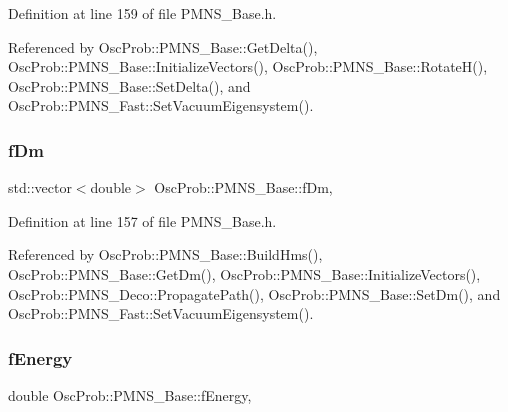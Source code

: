 Definition at line 159 of file P\+M\+N\+S\+\_\+\+Base.\+h.



Referenced by Osc\+Prob\+::\+P\+M\+N\+S\+\_\+\+Base\+::\+Get\+Delta(), Osc\+Prob\+::\+P\+M\+N\+S\+\_\+\+Base\+::\+Initialize\+Vectors(), Osc\+Prob\+::\+P\+M\+N\+S\+\_\+\+Base\+::\+Rotate\+H(), Osc\+Prob\+::\+P\+M\+N\+S\+\_\+\+Base\+::\+Set\+Delta(), and Osc\+Prob\+::\+P\+M\+N\+S\+\_\+\+Fast\+::\+Set\+Vacuum\+Eigensystem().

\mbox{\label{classOscProb_1_1PMNS__Base_a406a31c3b5d620e5a0cace5b411f9f70}} 
\subsubsection{\texorpdfstring{f\+Dm}{fDm}}
{\footnotesize\ttfamily std\+::vector$<$double$>$ Osc\+Prob\+::\+P\+M\+N\+S\+\_\+\+Base\+::f\+Dm\hspace{0.3cm}{\ttfamily [protected]}, {\ttfamily [inherited]}}



Definition at line 157 of file P\+M\+N\+S\+\_\+\+Base.\+h.



Referenced by Osc\+Prob\+::\+P\+M\+N\+S\+\_\+\+Base\+::\+Build\+Hms(), Osc\+Prob\+::\+P\+M\+N\+S\+\_\+\+Base\+::\+Get\+Dm(), Osc\+Prob\+::\+P\+M\+N\+S\+\_\+\+Base\+::\+Initialize\+Vectors(), Osc\+Prob\+::\+P\+M\+N\+S\+\_\+\+Deco\+::\+Propagate\+Path(), Osc\+Prob\+::\+P\+M\+N\+S\+\_\+\+Base\+::\+Set\+Dm(), and Osc\+Prob\+::\+P\+M\+N\+S\+\_\+\+Fast\+::\+Set\+Vacuum\+Eigensystem().

\mbox{\label{classOscProb_1_1PMNS__Base_a2800af6d436972f3e900867790c046b0}} 
\subsubsection{\texorpdfstring{f\+Energy}{fEnergy}}
{\footnotesize\ttfamily double Osc\+Prob\+::\+P\+M\+N\+S\+\_\+\+Base\+::f\+Energy\hspace{0.3cm}{\ttfamily [protected]}, {\ttfamily [inherited]}}



